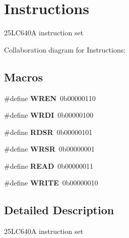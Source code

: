 \hypertarget{group___instructions}{}\section{Instructions}
\label{group___instructions}


25\+L\+C640A instruction set  


Collaboration diagram for Instructions\+:
\subsection*{Macros}
\begin{DoxyCompactItemize}
\item 
\mbox{\label{group___instructions_ga53dec1d28a7c7b24b2d56c058f7e140a}} 
\#define {\bfseries W\+R\+EN}~0b00000110
\item 
\mbox{\label{group___instructions_gacb229428140f30a6f8b6fa2ebb3fb6f0}} 
\#define {\bfseries W\+R\+DI}~0b00000100
\item 
\mbox{\label{group___instructions_ga899f71cf1ab9be6e8c8482e443558450}} 
\#define {\bfseries R\+D\+SR}~0b00000101
\item 
\mbox{\label{group___instructions_ga29d01dca16eb0a060d2efd567b58b47a}} 
\#define {\bfseries W\+R\+SR}~0b00000001
\item 
\mbox{\label{group___instructions_gada74e7db007a68e763f20c17f2985356}} 
\#define {\bfseries R\+E\+AD}~0b00000011
\item 
\mbox{\label{group___instructions_gaa10f470e996d0f51210d24f442d25e1e}} 
\#define {\bfseries W\+R\+I\+TE}~0b00000010
\end{DoxyCompactItemize}


\subsection{Detailed Description}
25\+L\+C640A instruction set 

